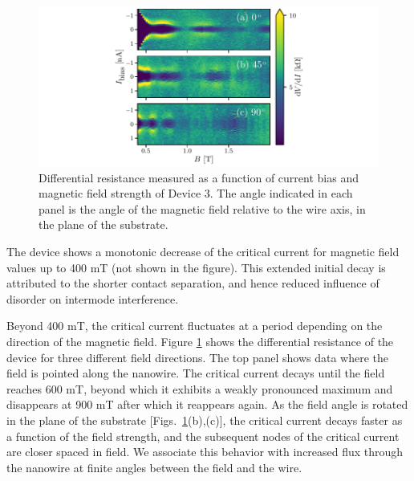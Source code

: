 \documentclass[english, aps,prb,showpacs,preprintnumber,amsmath,amssymb,superscriptaddress,reprint]{revtex4-1}
\begin{document}
\begin{figure}[h]
\centering
\includegraphics[width=\textwidth]{figures/sup_fig3}
\caption{Differential resistance measured as a function of current bias and magnetic field strength of Device 3. The angle indicated in each panel is the angle of the magnetic field relative to the wire axis, in the plane of the substrate.}
\label{fig:angle_dependence}
\end{figure}

The device shows a monotonic decrease of the critical current for magnetic field values up to 400 mT (not shown in the figure). This extended initial decay is attributed to the shorter contact separation, and hence reduced influence of disorder on intermode interference. 

Beyond 400 mT, the critical current fluctuates at a period depending on the direction of the magnetic field. 
Figure \ref{fig:angle_dependence} shows the differential resistance of the device for three different field directions. 
The top panel shows data where the field is pointed along the nanowire. 
The critical current decays until the field reaches 600 mT, beyond which it exhibits a weakly pronounced maximum and disappears at 900 mT after which it reappears again. 
As the field angle is rotated in the plane of the substrate [Figs.~\ref{fig:angle_dependence}(b),(c)], the critical current decays faster as a function of the field strength, and the subsequent nodes of the critical current are closer spaced in field. 
We associate this behavior with increased flux through the nanowire at finite angles between the field and the wire.
\end{document}

